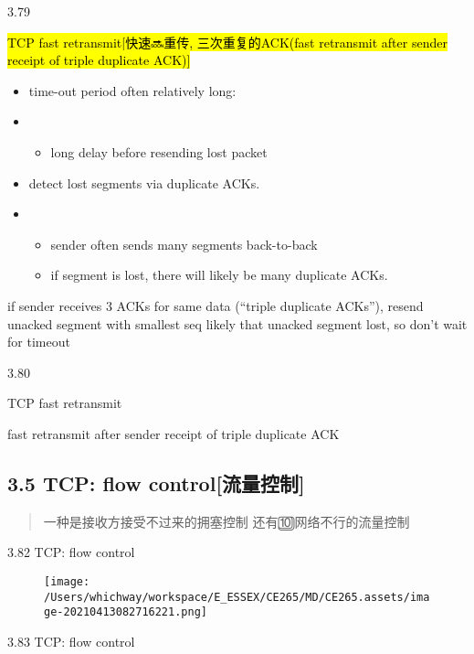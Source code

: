 \documentclass[
]{article}
\begin{document}
3.79

\hl{TCP fast retransmit{[}快速🔜重传, 三次重复的ACK(fast retransmit after
sender receipt of triple duplicate ACK){]}}

\begin{itemize}
\item
  time-out period often relatively long:
\item
  \begin{itemize}
  \item
    long delay before resending lost packet
  \end{itemize}
\item
  detect lost segments via duplicate ACKs.
\item
  \begin{itemize}
  \item
    sender often sends many segments back-to-back
  \item
    if segment is lost, there will likely be many duplicate ACKs.
  \end{itemize}
\end{itemize}

if sender receives 3 ACKs for same data (``triple duplicate ACKs''),
resend unacked segment with smallest seq likely that unacked segment
lost, so don't wait for timeout

3.80

TCP fast retransmit

fast retransmit after sender receipt of triple duplicate ACK

\hypertarget{35-tcp-flow-controlux6d41ux91cfux63a7ux5236}{%
\subsection{3.5 TCP: flow
control{[}流量控制{]}}\label{35-tcp-flow-controlux6d41ux91cfux63a7ux5236}}

\begin{quote}
一种是接收方接受不过来的拥塞控制 还有🔟网络不行的流量控制
\end{quote}

3.82 TCP: flow control

\begin{figure}
\centering
\texttt{[image: /Users/whichway/workspace/E\_ESSEX/CE265/MD/CE265.assets/image-20210413082716221.png]}
\caption{}
\end{figure}

3.83 TCP: flow control
\end{document}
